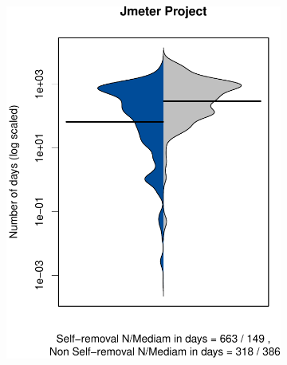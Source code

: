 \begin{figure}[t]
	\begin{subfigure}[b]{0.24\textwidth}
		\includegraphics[width=\textwidth]{figures/test/Jmeter.pdf}
		\label{fig:removal_comparison_gerrit}
	\end{subfigure}
	\begin{subfigure}[b]{0.24\textwidth}

\end{subfigure}
\end{figure}
